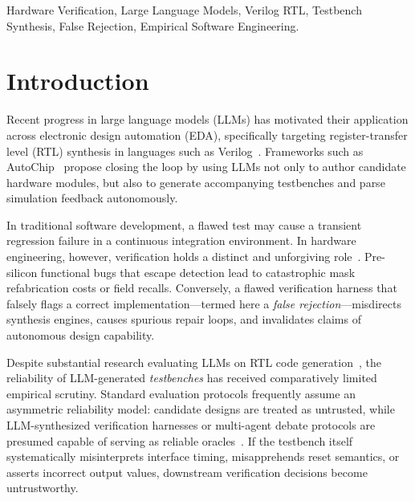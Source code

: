 \documentclass[conference]{IEEEtran}
\begin{document}
\begin{IEEEkeywords}
Hardware Verification, Large Language Models, Verilog RTL, Testbench Synthesis, False Rejection, Empirical Software Engineering.
\end{IEEEkeywords}

\section{Introduction}
Recent progress in large language models (LLMs) has motivated their application across electronic design automation (EDA), specifically targeting register-transfer level (RTL) synthesis in languages such as Verilog~\cite{liu2023verilogeval, lu2024rtllm, blocklove2023chipchat}. Frameworks such as AutoChip~\cite{thakur2023autochip} propose closing the loop by using LLMs not only to author candidate hardware modules, but also to generate accompanying testbenches and parse simulation feedback autonomously.

In traditional software development, a flawed test may cause a transient regression failure in a continuous integration environment. In hardware engineering, however, verification holds a distinct and unforgiving role~\cite{wile2005verilog}. Pre-silicon functional bugs that escape detection lead to catastrophic mask refabrication costs or field recalls. Conversely, a flawed verification harness that falsely flags a correct implementation---termed here a \textit{false rejection}---misdirects synthesis engines, causes spurious repair loops, and invalidates claims of autonomous design capability.

Despite substantial research evaluating LLMs on RTL code generation~\cite{liu2023verilogeval, lu2024rtllm}, the reliability of LLM-generated \textit{testbenches} has received comparatively limited empirical scrutiny. Standard evaluation protocols frequently assume an asymmetric reliability model: candidate designs are treated as untrusted, while LLM-synthesized verification harnesses or multi-agent debate protocols are presumed capable of serving as reliable oracles~\cite{du2023debate}. If the testbench itself systematically misinterprets interface timing, misapprehends reset semantics, or asserts incorrect output values, downstream verification decisions become untrustworthy.
\end{document}
